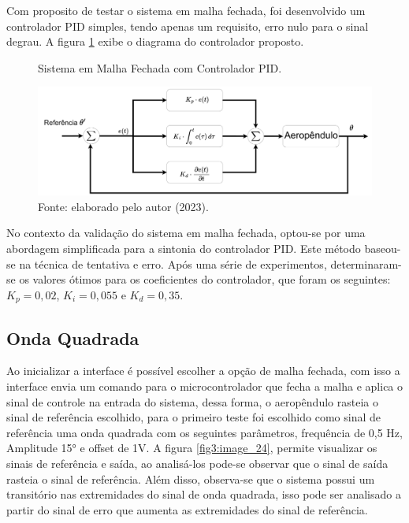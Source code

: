 Com  proposito de testar o sistema em malha fechada, foi desenvolvido um controlador PID simples, tendo apenas um requisito, erro nulo para o sinal degrau. A figura \ref{fig3:image_23} exibe o diagrama do controlador proposto.%


\begin{figure}[!h]
	\centering
	\caption{Sistema em Malha Fechada com Controlador PID.}
	\includegraphics[width=1\textwidth]{Capitulos/3_1_resultados_discurcao/3_figuras/estrutura_pid.pdf}
	\caption*{Fonte: elaborado pelo autor (2023).}
	\label{fig3:image_23}
\end{figure}


No contexto da validação do sistema em malha fechada, optou-se por uma abordagem simplificada para a sintonia do controlador PID. Este método baseou-se na técnica de tentativa e erro. Após uma série de experimentos, determinaram-se os valores ótimos para os coeficientes do controlador, que foram os seguintes: $K_p=0,02$, $K_i=0,055$ e $K_d=0,35$.



\subsection{Onda Quadrada}

Ao inicializar a interface é possível escolher a opção de malha fechada, com isso a interface envia um comando para o microcontrolador que fecha a malha e aplica o sinal de controle na entrada do sistema, dessa forma, o aeropêndulo rasteia o sinal de referência escolhido, para o primeiro teste foi escolhido como sinal de referência uma onda quadrada com os seguintes parâmetros, frequência de 0,5 Hz, Amplitude 15° e offset de 1V. A figura \ref{fig3:image_24}, permite visualizar os sinais de referência e saída, ao analisá-los pode-se observar que o sinal de saída rasteia o sinal de referência. Além disso, observa-se que o sistema possui um transitório nas extremidades do sinal de onda quadrada, isso pode ser analisado a partir do sinal de erro que aumenta as extremidades do sinal de referência.


